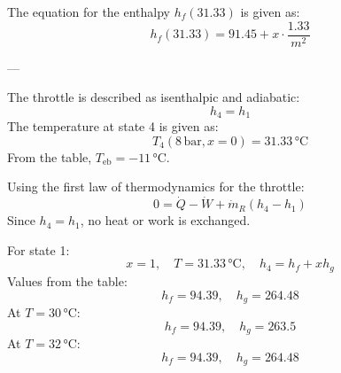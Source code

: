 The equation for the enthalpy \( h_f(31.33) \) is given as:  
\[
h_f(31.33) = 91.45 + x \cdot \frac{1.33}{m^2}
\]

---

The throttle is described as isenthalpic and adiabatic:  
\[
h_4 = h_1
\]  
The temperature at state 4 is given as:  
\[
T_4 (8 \, \text{bar}, x = 0) = 31.33 \, \text{°C}
\]  
From the table, \( T_{\text{eb}} = -11 \, \text{°C} \).

Using the first law of thermodynamics for the throttle:  
\[
0 = \dot{Q} - \dot{W} + \dot{m}_R \left( h_4 - h_1 \right)
\]  
Since \( h_4 = h_1 \), no heat or work is exchanged.

For state 1:  
\[
x = 1, \quad T = 31.33 \, \text{°C}, \quad h_4 = h_f + x h_g
\]  
Values from the table:  
\[
h_f = 94.39, \quad h_g = 264.48
\]  
At \( T = 30 \, \text{°C} \):  
\[
h_f = 94.39, \quad h_g = 263.5
\]  
At \( T = 32 \, \text{°C} \):  
\[
h_f = 94.39, \quad h_g = 264.48
\]